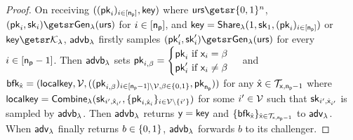 \begin{proof}
	On receiving $((\mathsf{pk}_i)_{i \in [\mathsf{n_p}]}, \mathsf{key})$ where $\urs \getsr \bin^{n}$, $(\pk_i, \sk_i) \getsr \gen(\urs)$ for $i \in [\mathsf{n_p}]$, and $\mathsf{key} = {\mathsf{Share}}_\lambda(1, \mathsf{sk}_{1}, (\mathsf{pk}_i)_{i \in [\mathsf{n_p}]})$ or $\key \getsr \nikeshkspace$, $\mathsf{advb}_{\lambda}$ firstly samples $(\pk^{\prime}_i, \sk^{\prime}_i) \getsr \gen(\urs)$ for every $i \in [\mathsf{n_p}-1]$. Then $\mathsf{advb}_{\lambda}$ sets $
		\mathsf{pk}_{i, \beta} = \begin{cases}
			\mathsf{pk}_{i}\text{ if }\mathsf{x}_{i} = \beta\\
			\mathsf{pk}^{\prime}_{i}\text{ if }\mathsf{x}_{i} \neq \beta
		\end{cases}
	$
	and $\mathsf{bfk}_{\hat{\mathsf{x}}} = (\mathsf{localkey}, \mathcal{V}, \allowbreak ((\mathsf{pk}_{i,\beta})_{i \in [\mathsf{n_p}-1]\backslash\mathcal{V}, \beta \in \{0, 1\}},\allowbreak \mathsf{pk}_{\mathsf{n_p}}))$ for any $\hat{\mathsf{x}} \in \mathcal{T}_{\mathsf{x}, \mathsf{n_p}-1}$ where $\mathsf{localkey} = \mathsf{Combine}_{\lambda}(\allowbreak \mathsf{sk}_{i^{\prime},\allowbreak \hat{\mathsf{x}}_{i^{\prime}}}, \allowbreak \{\mathsf{pk}_{i,\hat{\mathsf{x}}_i}\}_{i \in \mathcal{V}\backslash\{i^{\prime}\}})$ for some $i^{\prime} \in \mathcal{V}$ such that $\mathsf{sk}_{i^{\prime}, \hat{\mathsf{x}}_{i^{\prime}}}$ is sampled by $\mathsf{advb}_{\lambda}$. Then $\mathsf{advb}_{\lambda}$ returns $\mathsf{y} = \mathsf{key}$ and $\{\mathsf{bfk}_{\hat{\mathsf{x}}}\}_{\hat{\mathsf{x}}\in\mathcal{T}_{\mathsf{x}, \mathsf{n_p}-1}}$ to ${\mathsf{adv}}_\lambda$. When ${\mathsf{adv}}_\lambda$ finally returns $b \in \{0, 1\}$, $\mathsf{advb}_{\lambda}$ forwards $b$ to its challenger.
	

\end{proof}
